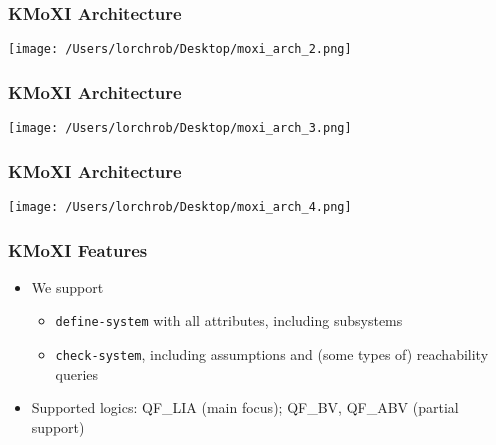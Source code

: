 \documentclass[11pt,xcolor={dvipsnames},hyperref={pdftex,pdfpagemode=UseNone,hidelinks,pdfdisplaydoctitle=true},usepdftitle=false]{beamer}
\newcommand{\code}[1]{{\footnotesize\texttt{#1}}}
\begin{document}
\begin{frame} 
    \frametitle{KMoXI Architecture}
    \texttt{[image: /Users/lorchrob/Desktop/moxi\_arch\_2.png]}
\end{frame}

\begin{frame} 
    \frametitle{KMoXI Architecture}
    \texttt{[image: /Users/lorchrob/Desktop/moxi\_arch\_3.png]}
\end{frame}

\begin{frame} 
    \frametitle{KMoXI Architecture}
    \texttt{[image: /Users/lorchrob/Desktop/moxi\_arch\_4.png]}
\end{frame}


\begin{frame}
    \frametitle{KMoXI Features} \pause
    \begin{itemize}
        \item We support
        \begin{itemize}
            \item \code{define-system} with all attributes, including subsystems
            \item \code{check-system}, including assumptions and (some types of) reachability queries
        \end{itemize} \pause
        \item Supported logics: QF\_LIA (main focus); QF\_BV, QF\_ABV \newline (partial support)
    \end{itemize}
\end{frame} 
\end{document}
